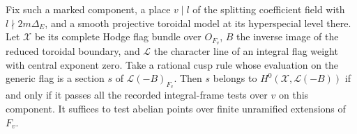 \begin{proposition}
\label{addh:good-lattice}
Fix such a marked component, a place \(v\mid l\) of the splitting
coefficient field with \(l\nmid 2m\Delta_E\), and a smooth projective
toroidal model at its hyperspecial level there. Let \(\mathcal X\)
be its complete Hodge flag bundle over \(O_{F_v}\), \(B\) the
inverse image of the reduced toroidal boundary, and \(\mathcal L\)
the character line of an integral flag weight with central exponent
zero. Take a rational cusp rule whose evaluation on the generic
flag is a section \(s\) of \(\mathcal L(-B)_{F_v}\). Then \(s\)
belongs to \(H^0(\mathcal X,\mathcal L(-B))\) if and only if it
passes all the recorded integral-frame tests over \(v\) on this
component. It suffices to test abelian points over finite unramified
extensions of \(F_v\).
\end{proposition}
